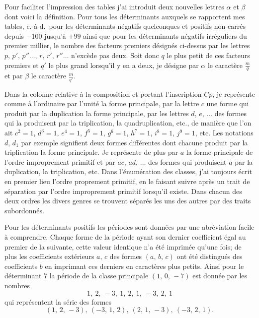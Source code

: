 \documentclass[11pt,a4paper]{article}
\theoremstyle{plain}
\begin{document}
Pour faciliter l'impression des tables j'ai introduit deux nouvelles lettres $\alpha$ et $\beta$ dont voici la d\'efinition. Pour tous les d\'eterminants auxquels se rapportent mes tables, c.-\`a-d.\ pour les d\'eterminants n\'egatifs quelconques et positifs non-carr\'es depuis $-100$ jusqu'\`a $+99$ ainsi que pour les d\'eterminants n\'egatifs irr\'eguliers du premier millier, le nombre des facteurs premiers d\'esign\'es ci-dessus par les lettres $p,\,p',\,p''\ldots,\,r,\,r',\,r''\ldots$ n'exc\`ede pas deux. Soit donc $q$ le plus petit de ces facteurs premiers et $q'$ le plus grand lorsqu'il y en a deux, je d\'esigne par $\alpha$ le caract\`ere $\tfrac{m}{q}$ et par $\beta$ le caract\`ere $\tfrac{m}{q'}$.

Dans la colonne relative \`a la composition et portant l'inscription $Cp$, je repr\'esente comme \`a l'ordinaire par l'unit\'e la forme principale, par la lettre $c$ une forme qui produit par la duplication la forme principale, par les lettres $d$, $e$, $\ldots$ des formes qui la produisent par la triplication, la quadruplication, etc., de mani\`ere que l'on ait $c^2 = 1$, $d^3 = 1$, $e^4 = 1$, $f^5 = 1$, $g^6 = 1$, $h^7 = 1$, $i^8 = 1$, $j^9 = 1$, etc. Les notations $d$, $d_1$ par exemple signifient deux formes diff\'erentes dont chacune produit par la triplication la forme principale. Je repr\'esente de plus par $a$ la forme principale de l'ordre improprement primitif et par $ac$, $ad$, $\ldots$ des formes qui produisent $a$ par la duplication, la triplication, etc. Dans l'\'enum\'eration des classes, j'ai toujours \'ecrit en premier lieu l'ordre proprement primitif, en le faisant suivre apr\`es un trait de s\'eparation par l'ordre improprement primitif lorsqu'il existe. Dans chacun des deux ordres les divers genres se trouvent s\'epar\'es les uns des autres par des traits subordonn\'es.

Pour les d\'eterminants positifs les p\'eriodes sont donn\'ees par une abr\'eviation facile \`a comprendre. Chaque forme de la p\'eriode ayant son dernier coefficient \'egal au premier de la suivante, cette valeur identique n'a \'et\'e imprim\'ee qu'une fois; de plus les coefficients ext\'erieurs $a$, $c$ des formes $(a,\,b,\,c)$ ont \'et\'e distingu\'es des coefficients $b$ en imprimant ces derniers en caract\`eres plus petits. Ainsi pour le d\'eterminant 7 la p\'eriode de la classe principale $(1,\,0,\,-7)$ est donn\'ee par les nombres
\[
1,\ 2,\ -3,\ 1,\ 2,\ 1,\ -3,\ 2,\ 1
\]
qui repr\'esentent la s\'erie des formes
\[
(1,\,2,\,-3),\ (-3,\,1,\,2),\ (2,\,1,\,-3),\ (-3,\,2,\,1).
\]
\end{document}

